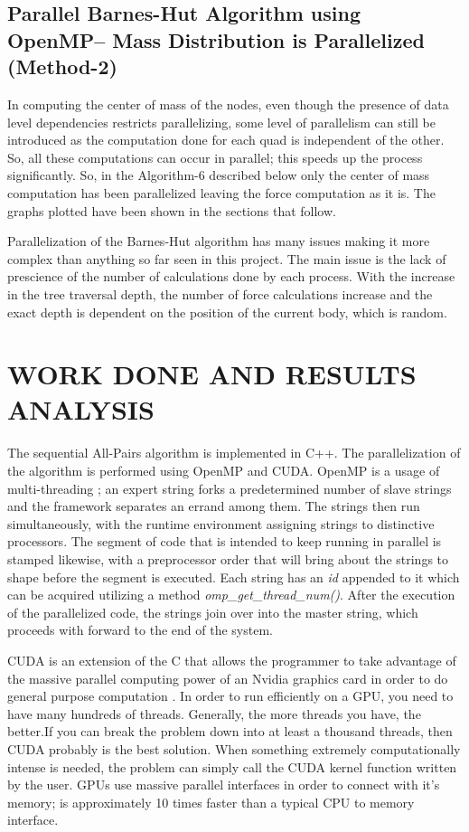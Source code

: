 \documentclass[letterpaper, 10 pt, conference]{ieeeconf}
\begin{document}
\subsection{Parallel Barnes-Hut Algorithm using OpenMP{--} Mass Distribution is Parallelized (Method-2)}

In computing the center of mass of the nodes, even though the presence of data level dependencies restricts parallelizing, some level of parallelism can still be introduced as the computation done for each quad is independent of the other. So, all these computations can occur in parallel; this speeds up the process significantly. So, in the Algorithm-6 described below only the center of mass computation has been parallelized leaving the force computation as it is. The graphs plotted have been shown in the sections that follow. \par

Parallelization of the Barnes-Hut algorithm has many issues making it more complex than anything so far seen in this project. The main issue is the lack of prescience of the number of calculations done by each process. With the increase in the tree traversal depth, the number of force calculations increase and the exact depth is dependent on the position of the current body, which is random. 


\section{WORK DONE AND RESULTS ANALYSIS}

The sequential  All-Pairs algorithm is implemented in C++. The parallelization of the algorithm is performed using OpenMP and CUDA. OpenMP is a usage of multi-threading \cite{c11}; an expert string forks a predetermined number of slave strings and the framework separates an errand among them. The strings then run simultaneously, with the runtime environment assigning strings to distinctive processors. The segment of code that is intended to keep running in parallel is stamped likewise, with a preprocessor order that will bring about the strings to shape before the segment is executed. Each string has an \textit{id} appended to it which can be acquired utilizing a method \textit{omp\_get\_thread\_num()}. After the execution of the parallelized code, the strings join over into the master string, which proceeds with forward to the end of the system. \par

CUDA is an extension of the C that allows the programmer to take advantage of the massive parallel computing power of an Nvidia graphics card in order to do general purpose computation \cite{c12}. In order to run efficiently on a GPU, you need to have many hundreds of threads. Generally, the more threads you have, the better.If you can break the problem down into at least a thousand threads, then CUDA probably is the best solution. When something extremely computationally intense is needed, the problem can simply call the CUDA kernel function written by the user. GPUs use massive parallel interfaces in order to connect with it’s memory; is approximately 10 times faster than a typical CPU to memory interface. \par
\end{document}
